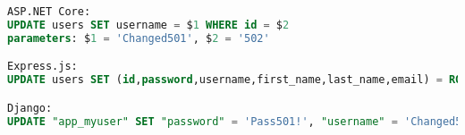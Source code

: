 \begin{lstlisting}[language=SQL,caption={\acrshort{sql} commands for updating objects},breaklines=true,label={lst:sqlPut}]
ASP.NET Core:
UPDATE users SET username = $1 WHERE id = $2
parameters: $1 = 'Changed501', $2 = '502'

Express.js:
UPDATE users SET (id,password,username,first_name,last_name,email) = ROW('502','Pass501!','Changed501','First501','Last501','First501@Last501.com') WHERE id = 502 RETURNING *

Django:
UPDATE "app_myuser" SET "password" = 'Pass501!', "username" = 'Changed501', "first_name" = 'First501', "last_name" = 'Last501', "email" = 'First501@Last501.com' WHERE "app_myuser"."id" = 502
\end{lstlisting}
